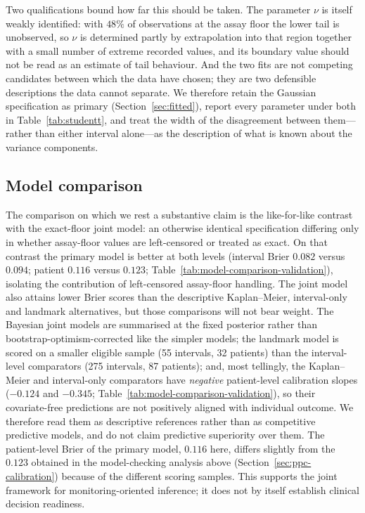 \documentclass[11pt]{article}
\begin{document}
Two qualifications bound how far this should be taken. The parameter $\nu$ is
itself weakly identified: with $48\%$ of observations at the assay floor the
lower tail is unobserved, so $\nu$ is determined partly by extrapolation into
that region together with a small number of extreme recorded values, and its
boundary value should not be read as an estimate of tail behaviour. And the two
fits are not competing candidates between which the data have chosen; they are
two defensible descriptions the data cannot separate. We therefore retain the
Gaussian specification as primary (Section~\ref{sec:fitted}), report every
parameter under both in Table~\ref{tab:studentt}, and treat the width of the
disagreement between them---rather than either interval alone---as the
description of what is known about the variance components.



\subsection{Model comparison}
\label{sec:modelcomparison}

The comparison on which we rest a substantive claim is the like-for-like
contrast with the exact-floor joint model: an otherwise identical specification
differing only in whether assay-floor values are left-censored or treated as
exact. On that contrast the primary model is better at both levels
(interval Brier $0.082$ versus $0.094$; patient $0.116$ versus $0.123$;
Table~\ref{tab:model-comparison-validation}), isolating the contribution of
left-censored assay-floor handling. The joint model also attains lower Brier
scores than the descriptive Kaplan--Meier, interval-only and landmark
alternatives, but those comparisons will not bear weight. The Bayesian joint
models are summarised at the fixed posterior rather than
bootstrap-optimism-corrected like the simpler models; the landmark model is
scored on a smaller eligible sample (55 intervals, 32 patients) than the
interval-level comparators (275 intervals, 87 patients); and, most tellingly,
the Kaplan--Meier and interval-only comparators have \emph{negative}
patient-level calibration slopes ($-0.124$ and $-0.345$;
Table~\ref{tab:model-comparison-validation}), so their covariate-free
predictions are not positively aligned with individual outcome. We therefore
read them as descriptive references rather than as competitive predictive
models, and do not claim predictive superiority over them. The
patient-level Brier of the primary model, $0.116$ here, differs slightly from
the $0.123$ obtained in the model-checking analysis above
(Section~\ref{sec:ppc-calibration}) because of the different scoring samples. This supports the joint framework
for monitoring-oriented inference; it does not by itself establish clinical
decision readiness.
\end{document}
